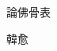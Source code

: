 \documentclass{ctexart}
\begin{document}
\begin{center}
        論佛骨表
\end{center}
\begin{center}
        韓愈
\end{center}

\end{document}
